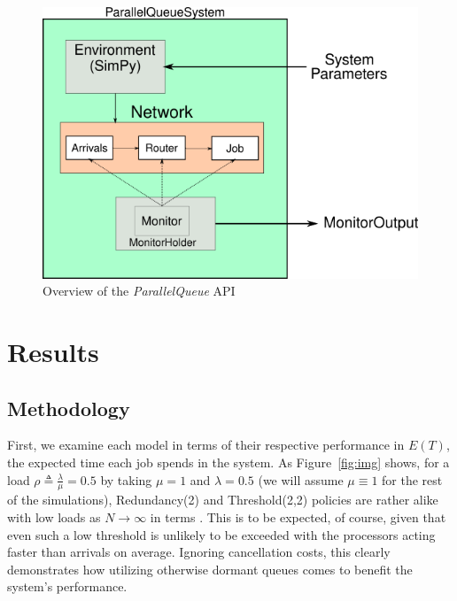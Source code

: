 \begin{figure}
    \centering
    \includegraphics[scale=0.7]{pq}
    \caption{Overview of the \textit{ParallelQueue} API}
    \label{fig:API}
\end{figure}


\section{Results}\label{sec:results}

\subsection{Methodology}\label{subsec:methodology}
First, we examine each model in terms of their respective performance in $E(T)$, the expected time each job spends in the system.
As Figure~\ref{fig:img} shows, for a load $\rho \triangleq \frac{\lambda}{\mu} = 0.5$ by taking $\mu=1$ and $\lambda = 0.5$ (we will assume $\mu \equiv 1$ for the
rest of the simulations), Redundancy(2) and Threshold(2,2) policies are rather alike with low loads as $N \rightarrow \infty$ in terms .
This is to be expected, of course, given that even such a low threshold is unlikely to be exceeded with the processors acting faster than arrivals on average.
Ignoring cancellation costs, this clearly demonstrates how utilizing otherwise dormant queues comes to benefit the system's performance.

